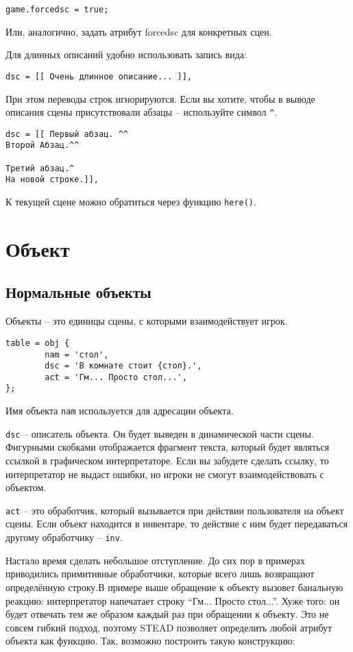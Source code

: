 \documentclass[a4paper,12pt]{article}
\begin{document}
\begin{verbatim}
game.forcedsc = true;
\end{verbatim}

Или, аналогично, задать атрибут forcedsc для конкретных сцен.

Для длинных описаний удобно использовать запись вида:

\begin{verbatim}
dsc = [[ Очень длинное описание... ]],
\end{verbatim}

При этом переводы строк игнорируются. Если вы хотите, чтобы в выводе описания сцены присутствовали абзацы -- используйте символ \verb/^/.

\begin{verbatim}
dsc = [[ Первый абзац. ^^
Второй Абзац.^^

Третий абзац.^
На новой строке.]],
\end{verbatim}

К текущей сцене можно обратиться через функцию \verb/here()/.

\section{Объект}
\subsection{Нормальные объекты}
Объекты -- это единицы сцены, с которыми взаимодействует игрок.

\begin{verbatim}
table = obj {
        nam = 'стол',
        dsc = 'В комнате стоит {стол}.',
        act = 'Гм... Просто стол...',
};
\end{verbatim}

Имя объекта \verb/nam/ используется для адресации объекта.

\verb/dsc/ -- описатель объекта. Он будет выведен в динамической части сцены. Фигурными скобками отображается фрагмент текста, который будет являться ссылкой в графическом интерпретаторе. Если вы забудете сделать ссылку, то интерпретатор не выдаст ошибки, но игроки не смогут взаимодействовать с объектом.

\verb/act/ -- это обработчик, который вызывается при действии пользователя на объект сцены. Если объект находится в инвентаре, то действие с ним будет передаваться другому обработчику -- \verb/inv/.

Настало время сделать небольшое отступление. До сих пор в примерах приводились примитивные обработчики, которые всего лишь возвращают определённую строку.В примере выше обращение к объекту вызовет банальную реакцию: интерпретатор напечатает строку ``Гм... Просто стол...''. Хуже того: он будет отвечать тем же образом каждый раз при обращении к объекту. Это не совсем гибкий подход, поэтому STEAD позволяет определить любой атрибут объекта как функцию. Так, возможно построить такую конструкцию:
\end{document}
